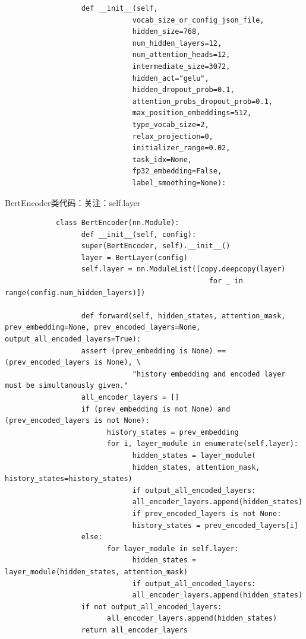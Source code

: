 \documentclass[a4paper]{article}
\begin{document}
\begin{sloppypar}
\begin{lstlisting}
                  def __init__(self,
                              vocab_size_or_config_json_file,
                              hidden_size=768,
                              num_hidden_layers=12,
                              num_attention_heads=12,
                              intermediate_size=3072,
                              hidden_act="gelu",
                              hidden_dropout_prob=0.1,
                              attention_probs_dropout_prob=0.1,
                              max_position_embeddings=512,
                              type_vocab_size=2,
                              relax_projection=0,
                              initializer_range=0.02,
                              task_idx=None,
                              fp32_embedding=False,
                              label_smoothing=None):
      \end{lstlisting}

      BertEncoder类代码：关注：self.layer

      \begin{lstlisting}
            class BertEncoder(nn.Module):
                  def __init__(self, config):
                  super(BertEncoder, self).__init__()
                  layer = BertLayer(config)
                  self.layer = nn.ModuleList([copy.deepcopy(layer)
                                                for _ in range(config.num_hidden_layers)])
            
                  def forward(self, hidden_states, attention_mask, prev_embedding=None, prev_encoded_layers=None, output_all_encoded_layers=True):
                  assert (prev_embedding is None) == (prev_encoded_layers is None), \
                              "history embedding and encoded layer must be simultanously given."
                  all_encoder_layers = []
                  if (prev_embedding is not None) and (prev_encoded_layers is not None):
                        history_states = prev_embedding
                        for i, layer_module in enumerate(self.layer):
                              hidden_states = layer_module(
                              hidden_states, attention_mask, history_states=history_states)
                              if output_all_encoded_layers:
                              all_encoder_layers.append(hidden_states)
                              if prev_encoded_layers is not None:
                              history_states = prev_encoded_layers[i]
                  else:
                        for layer_module in self.layer:
                              hidden_states = layer_module(hidden_states, attention_mask)
                              if output_all_encoded_layers:
                              all_encoder_layers.append(hidden_states)
                  if not output_all_encoded_layers:
                        all_encoder_layers.append(hidden_states)
                  return all_encoder_layers
            \end{lstlisting}


\end{sloppypar}
\end{document}
